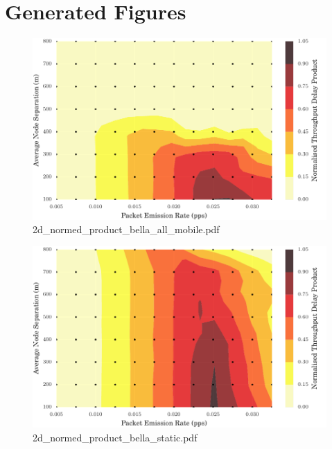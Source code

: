 \documentclass{article}
\begin{document}
\section{Generated Figures}


\begin{figure}[h!]
\centering
\includegraphics[width=\linewidth]{2d_normed_product_bella_all_mobile.pdf}
\caption{2d\_normed\_product\_bella\_all\_mobile.pdf}
\end{figure}




\begin{figure}[h!]
\centering
\includegraphics[width=\linewidth]{2d_normed_product_bella_static.pdf}
\caption{2d\_normed\_product\_bella\_static.pdf}
\end{figure}
\end{document}
